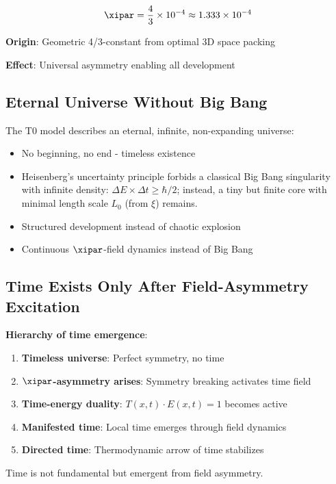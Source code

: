 	\begin{equation}
		\xipar = \frac{4}{3} \times 10^{-4} \approx 1.333 \times 10^{-4}
	\end{equation}
	
	\textbf{Origin}: Geometric 4/3-constant from optimal 3D space packing
	
	\textbf{Effect}: Universal asymmetry enabling all development
	
	\subsection{Eternal Universe Without Big Bang}
	
	The T0 model describes an eternal, infinite, non-expanding universe:
	
	\begin{itemize}
		\item No beginning, no end - timeless existence
		\item Heisenberg's uncertainty principle forbids a classical Big Bang singularity with infinite density: $\Delta E \times \Delta t \geq \hbar/2$; instead, a tiny but finite core with minimal length scale $L_0$ (from $\xi$) remains.
		\item Structured development instead of chaotic explosion
		\item Continuous $\xipar$-field dynamics instead of Big Bang
	\end{itemize}
	
	\subsection{Time Exists Only After Field-Asymmetry Excitation}
	
	\textbf{Hierarchy of time emergence}:
	\begin{enumerate}
		\item \textbf{Timeless universe}: Perfect symmetry, no time
		\item \textbf{$\xipar$-asymmetry arises}: Symmetry breaking activates time field
		\item \textbf{Time-energy duality}: $T(x,t) \cdot E(x,t) = 1$ becomes active
		\item \textbf{Manifested time}: Local time emerges through field dynamics
		\item \textbf{Directed time}: Thermodynamic arrow of time stabilizes
	\end{enumerate}
	
	Time is not fundamental but emergent from field asymmetry.
	
